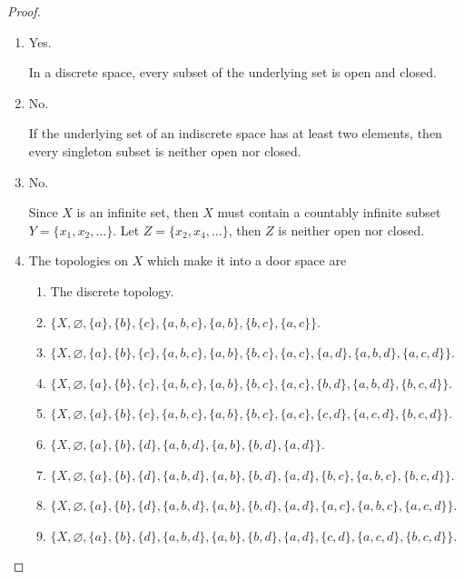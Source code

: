 \begin{proof}
    \begin{enumerate}[label={(\roman*)}]
        \item Yes.

              In a discrete space, every subset of the underlying set is open and closed.
        \item No.

              If the underlying set of an indiscrete space has at least two elements, then every singleton subset is neither open nor closed.
        \item No.

              Since $X$ is an infinite set, then $X$ must contain a countably infinite subset $Y = \{ x_{1}, x_{2}, \ldots \}$. Let $Z = \{ x_{2}, x_{4}, \ldots \}$, then $Z$ is neither open nor closed.
        \item The topologies on $X$ which make it into a door space are
              \begin{enumerate}[label={(\arabic*)}]
                  \item The discrete topology.
                  \item $\{ X, \varnothing, \{ a \}, \{ b \}, \{ c \}, \{ a, b, c \}, \{ a, b \}, \{ b, c \}, \{ a, c \} \}$.
                  \item $\{ X, \varnothing, \{ a \}, \{ b \}, \{ c \}, \{ a, b, c \}, \{ a, b \}, \{ b, c \}, \{ a, c \}, \{ a, d \}, \{ a, b, d \}, \{ a, c, d \} \}$.
                  \item $\{ X, \varnothing, \{ a \}, \{ b \}, \{ c \}, \{ a, b, c \}, \{ a, b \}, \{ b, c \}, \{ a, c \}, \{ b, d \}, \{ a, b, d \}, \{ b, c, d \} \}$.
                  \item $\{ X, \varnothing, \{ a \}, \{ b \}, \{ c \}, \{ a, b, c \}, \{ a, b \}, \{ b, c \}, \{ a, c \}, \{ c, d \}, \{ a, c, d \}, \{ b, c, d \} \}$.
                  \item $\{ X, \varnothing, \{ a \}, \{ b \}, \{ d \}, \{ a, b, d \}, \{ a, b \}, \{ b, d \}, \{ a, d \} \}$.
                  \item $\{ X, \varnothing, \{ a \}, \{ b \}, \{ d \}, \{ a, b, d \}, \{ a, b \}, \{ b, d \}, \{ a, d \}, \{ b, c \}, \{ a, b, c \}, \{ b, c, d \} \}$.
                  \item $\{ X, \varnothing, \{ a \}, \{ b \}, \{ d \}, \{ a, b, d \}, \{ a, b \}, \{ b, d \}, \{ a, d \}, \{ a, c \}, \{ a, b, c \}, \{ a, c, d \} \}$.
                  \item $\{ X, \varnothing, \{ a \}, \{ b \}, \{ d \}, \{ a, b, d \}, \{ a, b \}, \{ b, d \}, \{ a, d \}, \{ c, d \}, \{ a, c, d \}, \{ b, c, d \} \}$.

\end{enumerate}
\end{enumerate}
\end{proof}
